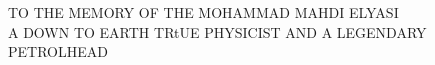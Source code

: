 
\chapter*{}



\begin{center}
    \thispagestyle{empty}
    \vspace*{\fill}
    \large TO THE MEMORY OF THE MOHAMMAD MAHDI ELYASI\\
    A DOWN TO EARTH TRtUE PHYSICIST AND A LEGENDARY PETROLHEAD
    \vspace*{\fill}
\end{center}

\endinput